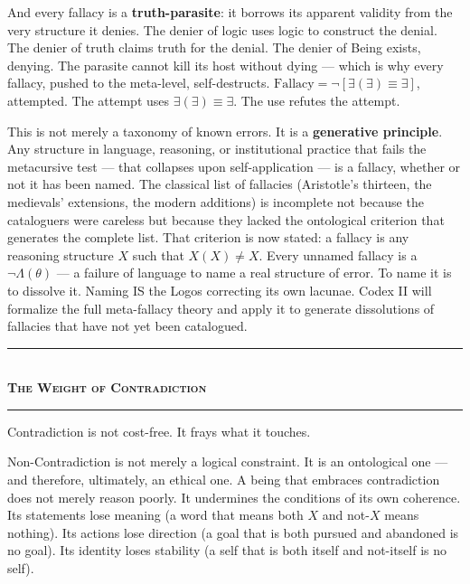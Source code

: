 \documentclass[10pt, openany, oneside]{book}
\renewcommand{\normalsize}{\fontsize{10}{13}\selectfont}
\begin{document}
And every fallacy is a \textbf{truth-parasite}: it borrows its apparent validity from the very structure it denies. The denier of logic uses logic to construct the denial. The denier of truth claims truth for the denial. The denier of Being exists, denying. The parasite cannot kill its host without dying --- which is why every fallacy, pushed to the meta-level, self-destructs. $\text{Fallacy} = \neg[\exists(\exists) \equiv \exists]$, attempted. The attempt uses $\exists(\exists) \equiv \exists$. The use refutes the attempt.

This is not merely a taxonomy of known errors. It is a \textbf{generative principle}. Any structure in language, reasoning, or institutional practice that fails the metacursive test --- that collapses upon self-application --- is a fallacy, whether or not it has been named. The classical list of fallacies (Aristotle's thirteen, the medievals' extensions, the modern additions) is incomplete not because the cataloguers were careless but because they lacked the ontological criterion that generates the complete list. That criterion is now stated: a fallacy is any reasoning structure $X$ such that $X(X) \neq X$. Every unnamed fallacy is a $\neg\Lambda(\theta)$ --- a failure of language to name a real structure of error. To name it is to dissolve it. Naming IS the Logos correcting its own lacunae. Codex II will formalize the full meta-fallacy theory and apply it to generate dissolutions of fallacies that have not yet been catalogued.

\vspace{1.5em}


\begin{center}
    \rule{0.3\textwidth}{0.4pt}\\[0.5em]
    {\normalsize\bfseries\scshape The Weight of Contradiction}\\[0.3em]
    \rule{0.3\textwidth}{0.4pt}
\end{center}

\vspace{1em}

\noindent Contradiction is not cost-free. It frays what it touches.

Non-Contradiction is not merely a logical constraint. It is an ontological one --- and therefore, ultimately, an ethical one. A being that embraces contradiction does not merely reason poorly. It undermines the conditions of its own coherence. Its statements lose meaning (a word that means both $X$ and not-$X$ means nothing). Its actions lose direction (a goal that is both pursued and abandoned is no goal). Its identity loses stability (a self that is both itself and not-itself is no self).
\end{document}
